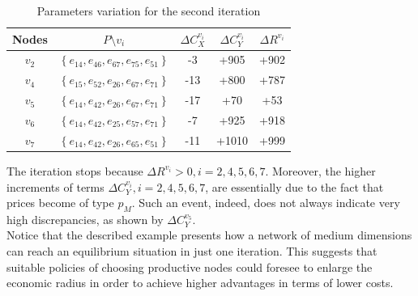 \begin{table}
    \centering
    \begin{tabular}{|c|c|c|c|c|}
        \hline
        \textbf{Nodes} & \textbf{$P \setminus v_i$} & \textbf{$\Delta C_X^{v_i}$} & \textbf{$\Delta C_Y^{v_i}$} & \textbf{$\Delta R^{v_i}$} \\
        \hline
        $v_2$ & $\left\{e_{14}, e_{46}, e_{67}, e_{75}, e_{51} \right\}$ & -3 & +905 & +902 \\
        \hline
        $v_4$ & $\left\{e_{15}, e_{52}, e_{26}, e_{67}, e_{71} \right\}$ & -13 & +800 & +787 \\
        \hline
        $v_5$ & $\left\{e_{14}, e_{42}, e_{26}, e_{67}, e_{71} \right\}$ & -17 & +70 & +53 \\
        \hline
        $v_6$ & $\left\{e_{14}, e_{42}, e_{25}, e_{57}, e_{71} \right\}$ & -7 & +925 & +918 \\
        \hline
        $v_7$ & $\left\{e_{14}, e_{42}, e_{26}, e_{65}, e_{51} \right\}$ & -11 & +1010 & +999 \\
        \hline
    \end{tabular}

    \caption{Parameters variation for the second iteration}
    \label{tab:second-test-reallocation-second-iteration}
\end{table}

The iteration stops because $\Delta R^{v_i} > 0 , i = 2,4,5,6,7$. Moreover, the higher increments of terms $\Delta C_Y^{v_i}, i = 2,4,5,6,7$, are essentially due to the fact that prices become of type $p_M$. Such an event, indeed, does not always indicate very high discrepancies, as shown by $\Delta C_Y^{v_5}$.\\
Notice that the described example presents how a network of medium dimensions can reach an equilibrium situation in just one iteration. This suggests that suitable policies of choosing productive nodes could foresee to enlarge the economic radius in order to achieve higher advantages in terms of lower costs.

